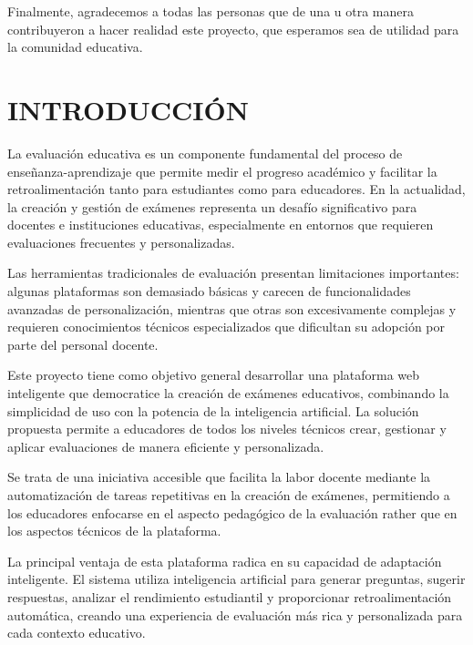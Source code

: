 \documentclass[12pt,a4paper]{report}
\begin{document}
Finalmente, agradecemos a todas las personas que de una u otra manera contribuyeron a hacer realidad este proyecto, que esperamos sea de utilidad para la comunidad educativa.

\newpage

\thispagestyle{titlepage}
\tableofcontents
\newpage

\thispagestyle{titlepage}
\lstlistoflistings
\newpage

\chapter*{INTRODUCCIÓN}

La evaluación educativa es un componente fundamental del proceso de enseñanza-aprendizaje que permite medir el progreso académico y facilitar la retroalimentación tanto para estudiantes como para educadores. En la actualidad, la creación y gestión de exámenes representa un desafío significativo para docentes e instituciones educativas, especialmente en entornos que requieren evaluaciones frecuentes y personalizadas.

Las herramientas tradicionales de evaluación presentan limitaciones importantes: algunas plataformas son demasiado básicas y carecen de funcionalidades avanzadas de personalización, mientras que otras son excesivamente complejas y requieren conocimientos técnicos especializados que dificultan su adopción por parte del personal docente.

Este proyecto tiene como objetivo general desarrollar una plataforma web inteligente que democratice la creación de exámenes educativos, combinando la simplicidad de uso con la potencia de la inteligencia artificial. La solución propuesta permite a educadores de todos los niveles técnicos crear, gestionar y aplicar evaluaciones de manera eficiente y personalizada.

Se trata de una iniciativa accesible que facilita la labor docente mediante la automatización de tareas repetitivas en la creación de exámenes, permitiendo a los educadores enfocarse en el aspecto pedagógico de la evaluación rather que en los aspectos técnicos de la plataforma.

La principal ventaja de esta plataforma radica en su capacidad de adaptación inteligente. El sistema utiliza inteligencia artificial para generar preguntas, sugerir respuestas, analizar el rendimiento estudiantil y proporcionar retroalimentación automática, creando una experiencia de evaluación más rica y personalizada para cada contexto educativo.
\end{document}

